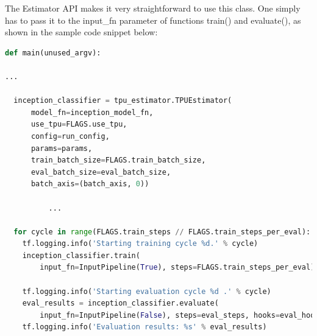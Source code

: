 \documentclass[14pt]{report}
\begin{document}
				The Estimator API makes it very straightforward to use this class. One simply has to pass it to the input\_fn parameter of functions train() and evaluate(), as shown in the sample code snippet below:\\
				\begin{lstlisting}[language=Python]
def main(unused_argv):

...

  inception_classifier = tpu_estimator.TPUEstimator(
      model_fn=inception_model_fn,
      use_tpu=FLAGS.use_tpu,
      config=run_config,
      params=params,
      train_batch_size=FLAGS.train_batch_size,
      eval_batch_size=eval_batch_size,
      batch_axis=(batch_axis, 0))

          ...

  for cycle in range(FLAGS.train_steps // FLAGS.train_steps_per_eval):
    tf.logging.info('Starting training cycle %d.' % cycle)
    inception_classifier.train(
        input_fn=InputPipeline(True), steps=FLAGS.train_steps_per_eval)

    tf.logging.info('Starting evaluation cycle %d .' % cycle)
    eval_results = inception_classifier.evaluate(
        input_fn=InputPipeline(False), steps=eval_steps, hooks=eval_hooks)
    tf.logging.info('Evaluation results: %s' % eval_results)
				\end{lstlisting}
\end{document}
